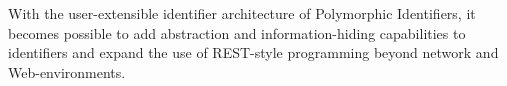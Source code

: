 \documentclass[preprint]{sigplanconf}
\begin{document}
With the user-extensible identifier architecture of Polymorphic Identifiers, it becomes possible to add abstraction
and information-hiding capabilities to identifiers and expand the use of REST-style
programming beyond network and Web-environments.











\vfill
\break






\balancecolumns
\end{document}
